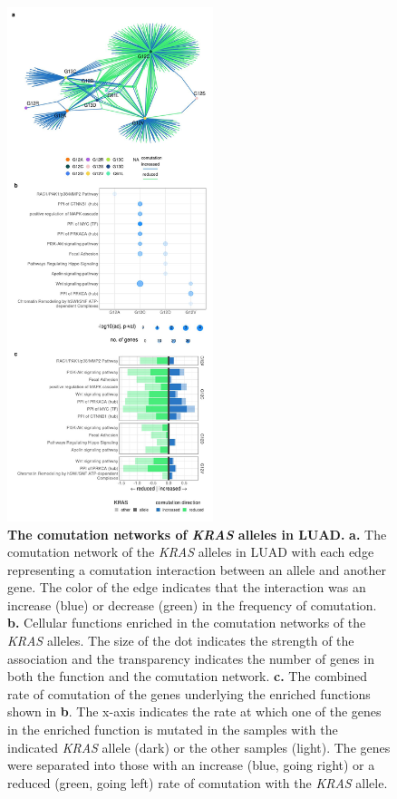 \documentclass[english, 12pt, letterpaper]{article}
\newcommand{\KRAS}{\emph{KRAS}}
\begin{document}
\begin{figure}
\centering
\includegraphics[height=150mm]{figures/Figure_03.jpeg}
\caption{
    \textbf{The comutation networks of \KRAS{} alleles in LUAD.}
    \textbf{a.} The comutation network of the \KRAS{} alleles in LUAD with each edge representing a comutation interaction between an allele and another gene. The color of the edge indicates that the interaction was an increase (blue) or decrease (green) in the frequency of comutation.
    \textbf{b.} Cellular functions enriched in the comutation networks of the \KRAS{} alleles. The size of the dot indicates the strength of the association and the transparency indicates the number of genes in both the function and the comutation network.
    \textbf{c.} The combined rate of comutation of the genes underlying the enriched functions shown in \textbf{b}. The x-axis indicates the rate at which one of the genes in the enriched function is mutated in the samples with the indicated \KRAS{} allele (dark) or the other samples (light). The genes were separated into those with an increase (blue, going right) or a reduced (green, going left) rate of comutation with the \KRAS{} allele.
}
\label{fig:luad-comutation-main}
\end{figure}
\end{document}
